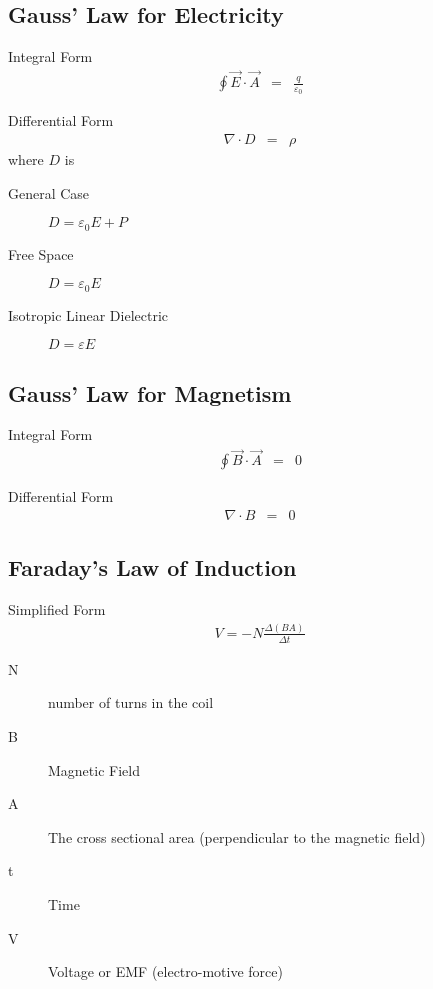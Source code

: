 \subsection{Gauss' Law for Electricity}

Integral Form
\begin{eqnarray}
\oint\vec{E}\cdot\vec{A}
&=& \frac{q}{\varepsilon_0}
\end{eqnarray}

Differential Form
\begin{eqnarray}
\nabla\cdot D
&=& \rho
\end{eqnarray}
where $D$ is
\begin{description}
\item[General Case] $D = \varepsilon_0E+P$
\item[Free Space] $D = \varepsilon_0E$
\item[Isotropic Linear Dielectric] $D = \varepsilon E$
\end{description}


\subsection{Gauss' Law for Magnetism}

Integral Form
\begin{eqnarray}
\oint\vec{B}\cdot\vec{A}
&=& 0
\end{eqnarray}

Differential Form
\begin{eqnarray}
\nabla\cdot B
&=& 0
\end{eqnarray}


\subsection{Faraday's Law of Induction}

Simplified Form
\begin{eqnarray}
V=-N\frac{\Delta(BA)}{\Delta t}
\end{eqnarray}
\begin{description}
  \item[N] number of turns in the coil
  \item[B] Magnetic Field
  \item[A] The cross sectional area (perpendicular to the magnetic field)
  \item[t] Time
  \item[V] Voltage or EMF (electro-motive force)
\end{description}

